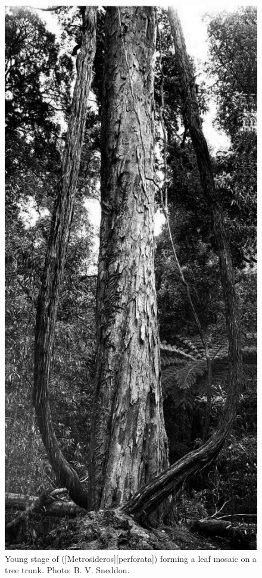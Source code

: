 {\begin{figure}[!t]
\begin{minipage}[t]{0.9\textwidth}
\begin{minipage}[t]{(\textwidth-\fgap) * \real{0.468}}
				\caption[Young stage of white climbing rata]{Young stage of  ([Metrosideros][perforata]) forming a leaf mosaic on a tree trunk. Photo: B. V. Sneddon.}%
				\label{fig:30rata}
			\end{minipage}\hspace{\fgap}%
			\begin{minipage}[t]{(\textwidth-\fgap) * \real{0.532}}
				\centering
				\includegraphics[width=\textwidth]{graphics/fig_031}

\end{minipage}
\end{minipage}
\end{figure}}
